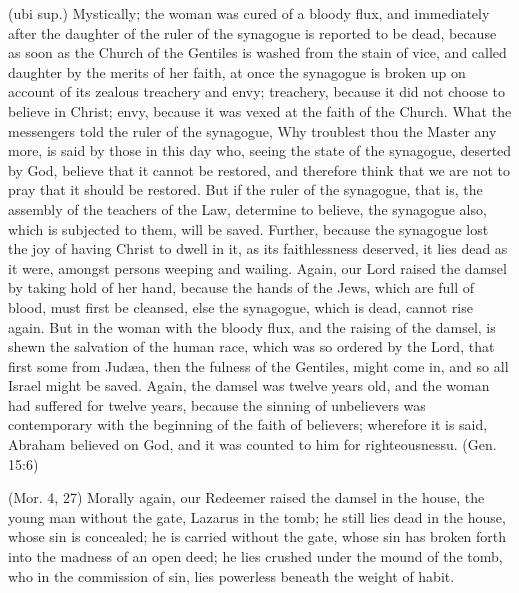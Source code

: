 (ubi sup.) Mystically; the woman was cured of a bloody flux, and immediately after the daughter of the ruler of the synagogue is reported to be dead, because as soon as the Church of the Gentiles is washed from the stain of vice, and called daughter by the merits of her faith, at once the synagogue is broken up on account of its zealous treachery and envy; treachery, because it did not choose to believe in Christ; envy, because it was vexed at the faith of the Church. What the messengers told the ruler of the synagogue, Why troublest thou the Master any more, is said by those in this day who, seeing the state of the synagogue, deserted by God, believe that it cannot be restored, and therefore think that we are not to pray that it should be restored. But if the ruler of the synagogue, that is, the assembly of the teachers of the Law, determine to believe, the synagogue also, which is subjected to them, will be saved. Further, because the synagogue lost the joy of having Christ to dwell in it, as its faithlessness deserved, it lies dead as it were, amongst persons weeping and wailing. Again, our Lord raised the damsel by taking hold of her hand, because the hands of the Jews, which are full of blood, must first be cleansed, else the synagogue, which is dead, cannot rise again. But in the woman with the bloody flux, and the raising of the damsel, is shewn the salvation of the human race, which was so ordered by the Lord, that first some from Judæa, then the fulness of the Gentiles, might come in, and so all Israel might be saved. Again, the damsel was twelve years old, and the woman had suffered for twelve years, because the sinning of unbelievers was contemporary with the beginning of the faith of believers; wherefore it is said, Abraham believed on God, and it was counted to him for righteousnessu. (Gen. 15:6)

 (Mor. 4, 27) Morally again, our Redeemer raised the damsel in the house, the young man without the gate, Lazarus in the tomb; he still lies dead in the house, whose sin is concealed; he is carried without the gate, whose sin has broken forth into the madness of an open deed; he lies crushed under the mound of the tomb, who in the commission of sin, lies powerless beneath the weight of habit.

